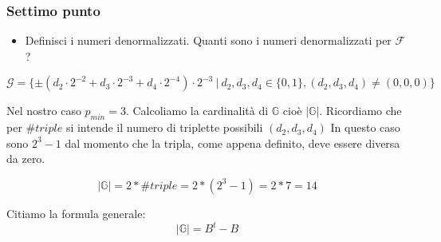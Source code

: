 \subsubsection{Settimo punto}
\begin{itemize}
  \item Definisci i numeri denormalizzati. Quanti sono i numeri denormalizzati per $\mathcal{F}$?
\end{itemize}

\begin{equation*}
  \mathcal{G} = \{\pm (d_2\cdot 2^{-2} + d_3\cdot 2^{-3} + d_4\cdot 2^{-4})\cdot 2^{-3} ~|~ d_2, d_3, d_4 \in \{0,1\} , (d_2, d_3, d_4) \neq (0,0,0) \}
\end{equation*}

Nel nostro caso $p_{min} = 3$. Calcoliamo la cardinalità di $\mathbb{G}$ cioè $|\mathbb{G}|$. Ricordiamo che per $\#triple$ si intende il numero di triplette possibili $(d_2,d_3,d_4)$ In questo caso sono $2^3 -1$ dal momento che la tripla, come appena definito, deve essere diversa da zero.

\begin{equation}
  |\mathbb{G}| = 2*\#triple = 2*(2^3-1) = 2*7 = 14
\end{equation}

Citiamo la formula generale:
\begin{equation}
    |\mathbb{G}| = B^t-B
  \end{equation}

